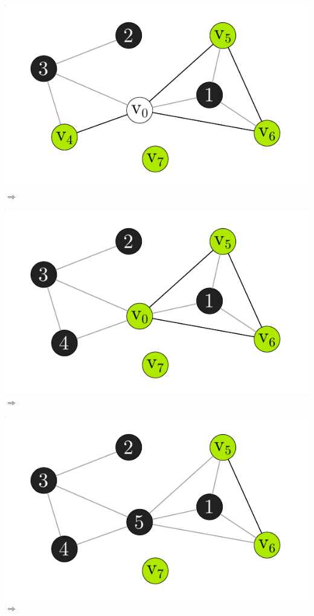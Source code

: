 \documentclass[xcolor=x11names,compress]{beamer}
\begin{document}
\begin{frame}
\begin{overprint}
		\includegraphics[scale=1.0]{img/graph/simplicialconstruction/04.pdf}
		\onslide<6>
		\( \Rightarrow \)

		\includegraphics[scale=1.0]{img/graph/simplicialconstruction/05.pdf}
		\onslide<7>
		\( \Rightarrow \)

		\includegraphics[scale=1.0]{img/graph/simplicialconstruction/06.pdf}
		\onslide<8>
		\( \Rightarrow \)


\end{overprint}
\end{frame}
\end{document}
